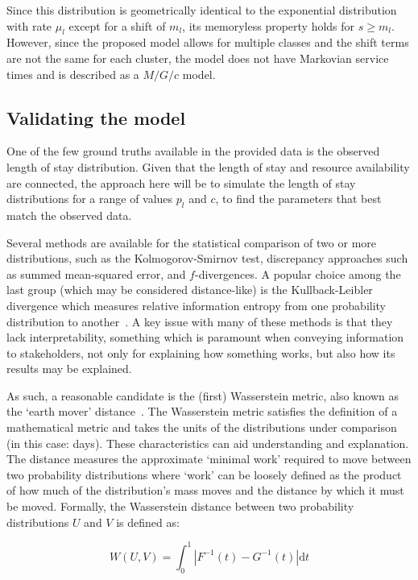 \documentclass[]{interact}
\theoremstyle{plain}%
\theoremstyle{definition}
\theoremstyle{remark}
\begin{document}
Since this distribution is geometrically identical to the exponential
distribution with rate \(\mu_l\) except for a shift of \(m_l\), its memoryless
property holds for \(s \ge m_l\). However, since the proposed model allows for
multiple classes and the shift terms are not the same for each cluster, the
model does not have Markovian service times and is described as a \(M/G/c\)
model.

\subsection{Validating the model}\label{subsec:validate}

One of the few ground truths available in the provided data is the observed
length of stay distribution. Given that the length of stay and resource
availability are connected, the approach here will be to simulate the length of
stay distributions for a range of values \(p_l\) and \(c\), to find the
parameters that best match the observed data.

Several methods are available for the statistical comparison of two or more
distributions, such as the Kolmogorov-Smirnov test, discrepancy approaches such
as summed mean-squared error, and \(f\)-divergences. A popular choice among the
last group (which may be considered distance-like) is the Kullback-Leibler
divergence which measures relative information entropy from one probability
distribution to another~\citep{Kullback1951}. A key issue with many of these
methods is that they lack interpretability, something which is paramount when
conveying information to stakeholders, not only for explaining how something
works, but also how its results may be explained.

As such, a reasonable candidate is the (first) Wasserstein metric, also known as
the `earth mover' distance~\citep{Vaserstein1969}. The Wasserstein metric
satisfies the definition of a mathematical metric and takes the units of the
distributions under comparison (in this case: days). These characteristics can
aid understanding and explanation. The distance measures the approximate
`minimal work' required to move between two probability distributions where
`work' can be loosely defined as the product of how much of the distribution's
mass moves and the distance by which it must be moved. Formally, the Wasserstein
distance between two probability distributions \(U\) and \(V\) is defined as:

\begin{equation}\label{eq:wasserstein}
    W(U, V) = {
        \int_{0}^{1} \left\vert F^{-1}(t) - G^{-1}(t) \right\vert \mathrm dt
    }
\end{equation}
\end{document}
